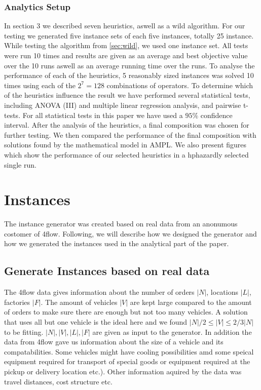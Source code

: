 \documentclass[../main.tex]{subfiles}
\begin{document}
\subsubsection{Analytics Setup}
In section 3 we described seven heuristics, aswell as a wild algorithm. 
For our testing we generated five instance sets of each five instances, totally 25 instance.
While testing the algorithm from \cref{sec:wild}, we used one instance set. 
All tests were run 10 times and results are given as an average and best objective value over the 10 runs aswell as an average running time over the runs.
To analyse the performance of each of the heuristics, 5 reasonably sized instances was solved 10 times using each of the $2^7 = 128$ combinations of operators.
To determine which of the heuristics influence the result we have performed several statistical tests, including ANOVA (III) and multiple linear regression analysis, and pairwise t-tests. 
For all statistical tests in this paper we have used a $95\%$ confidence interval.
After the analysis of the heuristics, a final composition was chosen for further testing.
We then compared the performance of the final composition with solutions found by the mathematical model in AMPL. We also present figures which show the performance of our selected heuristics in a hphazardly selected single run.

\section{Instances}
\label{sec:ins}
The instance generator was created based on real data from an anonumous costomer of 4flow. 
Following, we will describe how we designed the generator and how we generated the instances used in the analytical part of the paper.

\subsection{Generate Instances based on real data}
\label{sec:data}
The 4flow data gives information about the number of orders $|N|$, locations $|L|$, factories $|F|$. 
The amount of vehicles $|V|$ are kept large compared to the amount of orders to make sure there are enough but not too many vehicles. 
A solution that uses all but one vehicle is the ideal here and we found $|N|/2 \leq |V| \leq 2/3 |N|$ to be fitting.
$|N|, |V|, |L|, |F|$ are given as input to the generator.
In addition the data from 4flow gave us information about the size of a vehicle and its compatabilities. 
Some vehicles might have cooling possibilities amd some speical equipment required for transport of special goods or equipment required at the pickup or delivery location etc.).
Other information aquired by the data was travel distances, cost structure etc.
\end{document}
